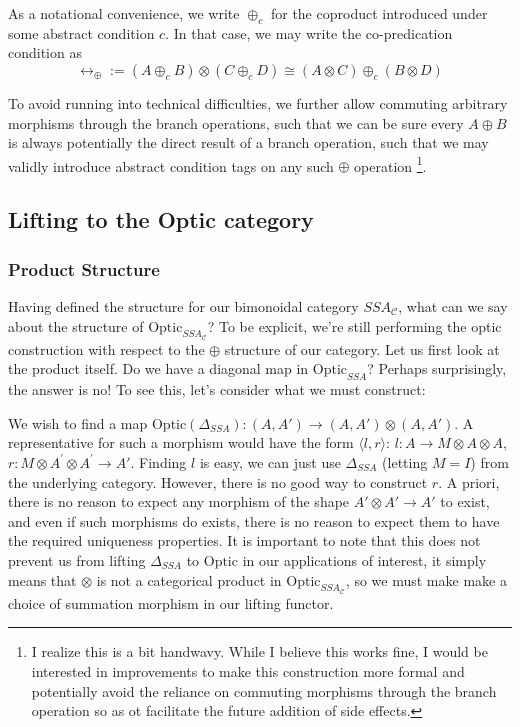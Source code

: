 \documentclass[letterpaper, 10 pt, conference]{ieeeconf}  %
\begin{document}
As a notational convenience, we write $\oplus_c$ for the coproduct introduced
under some abstract condition $c$. In that case, we may write the co-predication
condition as
\[ \leftrightarrow_{\oplus} := (A \oplus_c B) \otimes (C \oplus_c D) \cong (A \otimes C) \oplus_c (B \otimes D) \]

To avoid running into technical difficulties, we further allow commuting arbitrary
morphisms through the branch operations, such that we can be sure every $A \oplus B$
is always potentially the direct result of a branch operation, such that we may
validly introduce abstract condition tags on any such $\oplus$ operation
\footnote{I realize this is a bit handwavy. While I believe this works fine, I would
be interested in improvements to make this construction more formal and
potentially avoid the reliance on commuting morphisms through the branch operation
so as ot facilitate the future addition of side effects.}.

\subsection{Lifting to the Optic category}

\subsubsection{Product Structure}

Having defined the structure for our bimonoidal category $SSA_{\mathcal{C}}$,
what can we say about the structure of $\text{Optic}_{SSA_{\mathcal{C}}}$?
To be explicit, we're still performing the optic construction with respect to
the $\oplus$ structure of our category. Let us first look at the product itself.
Do we have a diagonal map in $\text{Optic}_{SSA}$? Perhaps surprisingly, the answer
is no! To see this, let's consider what we must construct:

We wish to find a map $\text{Optic}(\Delta_{SSA}): (A, A') \to (A, A') \otimes (A, A')$.
A representative for such a morphism would have the form $\langle l, r \rangle$:
$l: A \to M \otimes A \otimes A$, $r: M \otimes A^\prime \otimes A^\prime \to A'$.
Finding $l$ is easy, we can just use $\Delta_{SSA}$ (letting $M=I$) from the underlying category.
However, there is no good way to construct $r$. A priori, there is no reason
to expect any morphism of the shape $A' \otimes A' \to A'$ to exist, and even
if such morphisms do exists, there is no reason to expect them to have the
required uniqueness properties. It is important to note that this does not
prevent us from lifting $\Delta_{SSA}$ to $\text{Optic}$ in our applications
of interest, it simply means that $\otimes$ is not a categorical product in
$\text{Optic}_{SSA_{\mathcal{C}}}$, so we must make make a choice of summation
morphism in our lifting functor.
\end{document}
